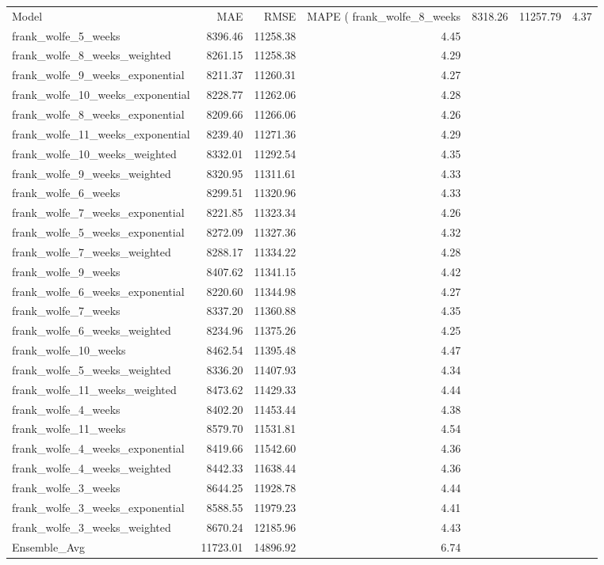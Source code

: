 \begin{tabular}{lrrr}
\toprule
Model & MAE & RMSE & MAPE (%
\midrule
frank_wolfe_8_weeks & 8318.26 & 11257.79 & 4.37 \\
frank_wolfe_5_weeks & 8396.46 & 11258.38 & 4.45 \\
frank_wolfe_8_weeks_weighted & 8261.15 & 11258.38 & 4.29 \\
frank_wolfe_9_weeks_exponential & 8211.37 & 11260.31 & 4.27 \\
frank_wolfe_10_weeks_exponential & 8228.77 & 11262.06 & 4.28 \\
frank_wolfe_8_weeks_exponential & 8209.66 & 11266.06 & 4.26 \\
frank_wolfe_11_weeks_exponential & 8239.40 & 11271.36 & 4.29 \\
frank_wolfe_10_weeks_weighted & 8332.01 & 11292.54 & 4.35 \\
frank_wolfe_9_weeks_weighted & 8320.95 & 11311.61 & 4.33 \\
frank_wolfe_6_weeks & 8299.51 & 11320.96 & 4.33 \\
frank_wolfe_7_weeks_exponential & 8221.85 & 11323.34 & 4.26 \\
frank_wolfe_5_weeks_exponential & 8272.09 & 11327.36 & 4.32 \\
frank_wolfe_7_weeks_weighted & 8288.17 & 11334.22 & 4.28 \\
frank_wolfe_9_weeks & 8407.62 & 11341.15 & 4.42 \\
frank_wolfe_6_weeks_exponential & 8220.60 & 11344.98 & 4.27 \\
frank_wolfe_7_weeks & 8337.20 & 11360.88 & 4.35 \\
frank_wolfe_6_weeks_weighted & 8234.96 & 11375.26 & 4.25 \\
frank_wolfe_10_weeks & 8462.54 & 11395.48 & 4.47 \\
frank_wolfe_5_weeks_weighted & 8336.20 & 11407.93 & 4.34 \\
frank_wolfe_11_weeks_weighted & 8473.62 & 11429.33 & 4.44 \\
frank_wolfe_4_weeks & 8402.20 & 11453.44 & 4.38 \\
frank_wolfe_11_weeks & 8579.70 & 11531.81 & 4.54 \\
frank_wolfe_4_weeks_exponential & 8419.66 & 11542.60 & 4.36 \\
frank_wolfe_4_weeks_weighted & 8442.33 & 11638.44 & 4.36 \\
frank_wolfe_3_weeks & 8644.25 & 11928.78 & 4.44 \\
frank_wolfe_3_weeks_exponential & 8588.55 & 11979.23 & 4.41 \\
frank_wolfe_3_weeks_weighted & 8670.24 & 12185.96 & 4.43 \\
Ensemble_Avg & 11723.01 & 14896.92 & 6.74 \\
\bottomrule
\end{tabular}
